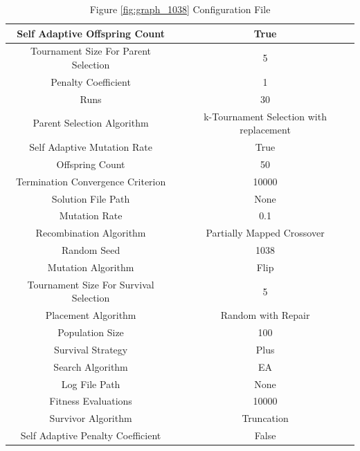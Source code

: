 \documentclass{standalone}
\begin{document}
\begin{table}[!htb]
	\centering
	\caption{Figure \ref{fig:graph_1038} Configuration File}
	\label{tab:graph_1038}
	\begin{tabular}{| c | c |}
		\hline
		Self Adaptive Offspring Count		& True		 \\
		\hline
		Tournament Size For Parent Selection		& 5		 \\
		\hline
		Penalty Coefficient		& 1		 \\
		\hline
		Runs		& 30		 \\
		\hline
		Parent Selection Algorithm		& k-Tournament Selection with replacement		 \\
		\hline
		Self Adaptive Mutation Rate		& True		 \\
		\hline
		Offspring Count		& 50		 \\
		\hline
		Termination Convergence Criterion		& 10000		 \\
		\hline
		Solution File Path		& None		 \\
		\hline
		Mutation Rate		& 0.1		 \\
		\hline
		Recombination Algorithm		& Partially Mapped Crossover		 \\
		\hline
		Random Seed		& 1038		 \\
		\hline
		Mutation Algorithm		& Flip		 \\
		\hline
		Tournament Size For Survival Selection		& 5		 \\
		\hline
		Placement Algorithm		& Random with Repair		 \\
		\hline
		Population Size		& 100		 \\
		\hline
		Survival Strategy		& Plus		 \\
		\hline
		Search Algorithm		& EA		 \\
		\hline
		Log File Path		& None		 \\
		\hline
		Fitness Evaluations		& 10000		 \\
		\hline
		Survivor Algorithm		& Truncation		 \\
		\hline
		Self Adaptive Penalty Coefficient		& False		 \\
		\hline
	\end{tabular}
\end{table}
\end{document}
